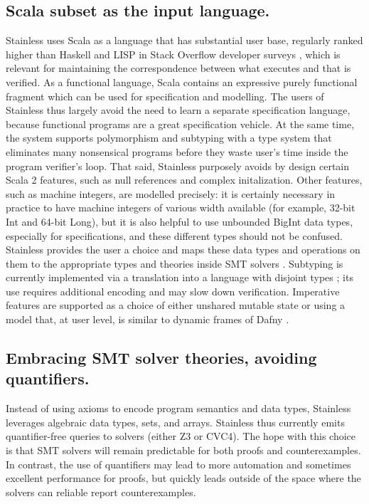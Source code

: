 \subsection{Scala subset as the input language.}
Stainless uses Scala as a language that has substantial user base,
regularly ranked higher than Haskell and LISP in Stack Overflow developer surveys \cite{surveys},
which is relevant for maintaining the correspondence between
what executes and that is verified. As a functional language, Scala
contains an expressive purely functional fragment which can be used
for specification and modelling. The users of Stainless thus largely
avoid the need to learn a separate specification language, because
functional programs are a great specification vehicle. At the same time,
the system supports polymorphism and subtyping with a type system
that eliminates many nonsensical programs before they waste user's time inside the program verifier's loop.
That said, Stainless purposely avoids by design certain Scala 2 features, such as null references and complex initalization.
Other features, such as machine integers, are modelled precisely: it is certainly
necessary in practice to have machine integers of various width available (for example, 32-bit Int and 64-bit Long),
but it is also helpful to use unbounded BigInt data types, especially for specifications, and these different types should
not be confused.
Stainless provides the user a choice and maps these data types and operations on them to the appropriate
types and theories inside SMT solvers \cite{BlancKuncak15SoundReasoningIntegralDataTypes}.
Subtyping is currently implemented via a translation into a language with disjoint types \cite{voirol2019}; its
use requires additional encoding and may slow down verification. Imperative features are supported
as a choice of either unshared mutable state \cite{blanc2017} or using a model \cite{schmid2021proving}
that, at user level, is similar to dynamic frames \cite{DBLP:conf/fm/Kassios06} of Dafny \cite{DBLP:conf/lpar/Leino10b}.

\subsection{Embracing SMT solver theories, avoiding quantifiers.}
Instead of using axioms to encode program semantics and data types,
Stainless leverages algebraic data types, sets, and arrays.
Stainless thus currently emits quantifier-free queries to solvers (either Z3 or CVC4).
The hope with this choice is that SMT solvers will remain predictable for both
proofs and counterexamples. In contrast, the use of quantifiers may lead to more automation and sometimes excellent performance for
proofs, but quickly leads
outside of the space where the solvers can reliable report counterexamples.

